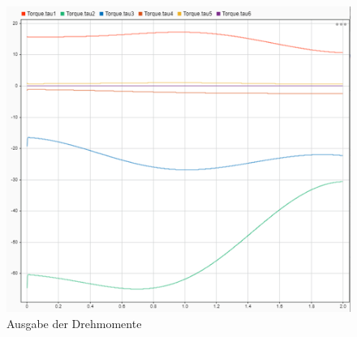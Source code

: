 \begin{figure}[!htbp]
	\centering
	\includegraphics[width=1\linewidth]{grafic/Drehmomente}
	\caption{Ausgabe der Drehmomente}
	\label{fig:drehmomente_simulation}
\end{figure}

